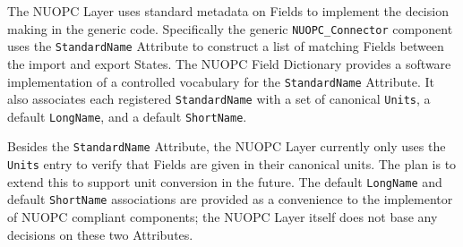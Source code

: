 %
The NUOPC Layer uses standard metadata on Fields to implement the decision making in the generic code. Specifically the generic {\tt NUOPC\_Connector} component uses the {\tt StandardName} Attribute to construct a list of matching Fields between the import and export States. The NUOPC Field Dictionary provides a software implementation of a controlled vocabulary for the {\tt StandardName} Attribute. It also associates each registered {\tt StandardName} with a set of canonical {\tt Units}, a default {\tt LongName}, and a default {\tt ShortName}.

Besides the {\tt StandardName} Attribute, the NUOPC Layer currently only uses the {\tt Units} entry to verify that Fields are given in their canonical units. The plan is to extend this to support unit conversion in the future. The default {\tt LongName} and default {\tt ShortName} associations are provided as a convenience to the implementor of NUOPC compliant components; the NUOPC Layer itself does not base any decisions on these two Attributes.
